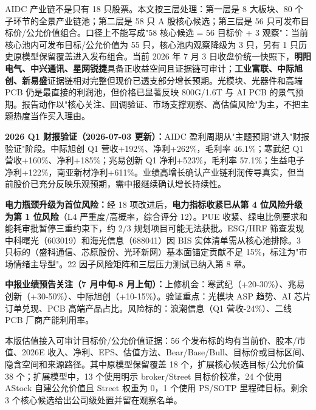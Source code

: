 \begin{houseviewbox}[核心结论]
AIDC 产业链不是只有 18 只股票。本文按三层处理：第一层是 8 大板块、80 个子环节的全景产业链池；第二层是 58 只 A 股核心候选；第三层是 56 只可发布目标价/公允价值组合。口径上不能写成"58 核心候选 = 56 目标价 + 3 观察"：当前核心池内可发布目标/公允价值为 55 只，核心池内观察降级为 3 只，另有 1 只历史原模型保留覆盖进入发布组合。当前 2026 年 7 月 3 日收盘价统一快照下，\textbf{明阳电气、中兴通讯、星网锐捷}具备正收益空间且证据链可审计；\textbf{工业富联、中际旭创、新易盛}证据链相对完整但现价已透支部分增长预期。光模块、光器件和高端 PCB 仍是最直接的利润池，但价格已显著反映 800G/1.6T 与 AI PCB 的景气预期。报告动作以"核心关注、回调验证、市场支撑观察、高估值风险"为主，不把主题热度当作买入理由。

\vspace{0.5em}
\textbf{2026 Q1 财报验证（2026-07-03 更新）：}AIDC 盈利周期从"主题预期"进入"财报验证"阶段。中际旭创 Q1 营收+192\%、净利+262\%，毛利率 46.1\%；寒武纪 Q1 营收+160\%、净利+185\%；兆易创新 Q1 净利+523\%，毛利率 57.1\%；生益电子净利+122\%，南亚新材净利+611\%。业绩高增长确认产业链利润传导真实，但当前股价已充分反映乐观预期，需中报继续确认增长持续性。

\vspace{0.5em}
\textbf{电力瓶颈升级为首位风险：}经 18 项改进后，\textbf{电力指标收紧已从第 4 位风险升级为第 1 位风险}（L4 严重度/高概率，综合评分 12）。PUE 收紧、绿电比例要求和能耗审批暂停三重约束下，约 2/3 规划项目可能无法获批。ESG/HRF 筛查发现中科曙光（603019）和海光信息（688041）因 BIS 实体清单需从核心池排除。3 只标的（盛科通信、芯原股份、光环新网）基本面锚定贡献不足 15\%，标注为"市场情绪主导型"。22 因子风险矩阵和三层压力测试已纳入第 8 章。

\vspace{0.5em}
\textbf{中报业绩预告关注（7 月中旬-8 月上旬）：}上修机会：寒武纪（+20-30\%）、兆易创新（+30-50\%）、中际旭创（+10-15\%）。验证重点：光模块 ASP 趋势、AI 芯片订单兑现、PCB 高端产品占比。风险标的：浪潮信息（Q1 营收-24\%）、二线 PCB 厂商产能利用率。
\end{houseviewbox}

\begin{riskbox}[发布状态]
本版估值接入可审计目标价/公允价值证据：56 个发布标的均有当前价、股本/市值、2026E 收入、净利、EPS、估值方法、Bear/Base/Bull、目标价或目标区间、隐含空间和来源路径。其中原模型保留覆盖 18 个，扩展核心候选目标/公允价值 38 个；扩展模型中，13 个使用明示 broker/Street 目标价校准，24 个使用 AStock 自建公允价值且 Street 权重为 0，1 个使用 PS/SOTP 里程碑目标。剩余 3 个核心候选给出公司级处置并留在观察名单。
\end{riskbox}

